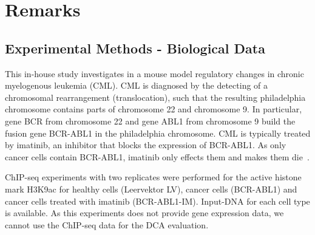 \chapter{Remarks}
\section{Experimental Methods - Biological Data}

This in-house study investigates in a mouse model regulatory changes in chronic myelogenous leukemia (CML).
CML is diagnosed by the detecting of a chromosomal rearrangement (trans\-location), such that the resulting philadelphia chromosome contains parts of chromosome 22 and chromosome 9.
In particular, gene BCR from chromosome 22 and gene ABL1 from chromosome 9 build the fusion gene BCR-ABL1 in the philadelphia chromosome.
CML is typically treated by imatinib, an inhibitor that blocks the expression of BCR-ABL1.
As only cancer cells contain BCR-ABL1, imatinib only effects them and makes them die~\citep{Sawyers1999}.

ChIP-seq experiments with two replicates were performed for the active histone mark H3K9ac for healthy cells (Leervektor LV), cancer cells (BCR-ABL1) and cancer cells treated with imatinib (BCR-ABL1-IM).
Input-DNA for each cell type is available.
As this experiments does not provide gene expression data, we cannot use the ChIP-seq data for the DCA evaluation.


